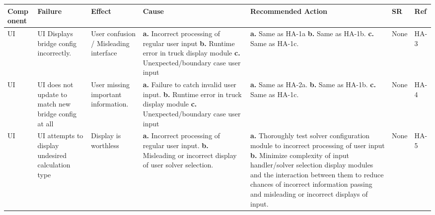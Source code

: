 \documentclass{article}
\begin{document}
\begin{landscape}
\begin{table}[H]
    \begin{tabular}{|p{} | p{} | p{} | p{} | p{} | p{} | p{}|}
    \toprule
    \textbf{Comp onent} & \textbf{Failure} & \textbf{Effect} & \textbf{Cause} & \textbf{Recommended Action} & \textbf{SR} & \textbf{Ref}\\
\midrule
    UI & UI Displays bridge config incorrectly. & User confusion / Misleading interface & \textbf{a.} Incorrect processing of regular user input\newline
    \textbf{b.} Runtime error in truck display module\newline
    \textbf{c.} Unexpected/boundary case user input 
&  \textbf{a.} Same as HA-1a\newline
    \textbf{b.} Same as HA-1b.\newline
    \textbf{c.} Same as HA-1c.
    &None&HA-3\\
\midrule
    UI & UI does not update to match new bridge config at all & User missing important information. &  \textbf{a.} Failure to catch invalid user input.\newline
    \textbf{b.} Runtime error in truck display module\newline
    \textbf{c.} Unexpected/boundary case user input 
&   \textbf{a.} Same as HA-2a.\newline
    \textbf{b.}  Same as HA-1b.\newline
    \textbf{c.} Same as HA-1c.
    &None&HA-4\\
\midrule
    UI&UI attempts to display undesired calculation type&Display is worthless&\textbf{a.} Incorrect processing of regular user input.\newline
    \textbf{b.} Misleading or incorrect display of user solver selection.
    &\textbf{a.} Thoroughly test solver configuration module to incorrect processing of user input\newline
    \textbf{b.} Minimize complexity of input handler/solver selection display modules and the interaction between them to reduce chances of incorrect information passing
     and misleading or incorrect displays of input.
    &None&HA-5\\
\bottomrule
  \end{tabular}
  \end{table}
  \pagebreak
  \begin{table}[H]
    \begin{tabular}{|p{} | p{} | p{} | p{} | p{} | p{} | p{}|}

\end{tabular}
\end{table}
\end{landscape}
\end{document}
